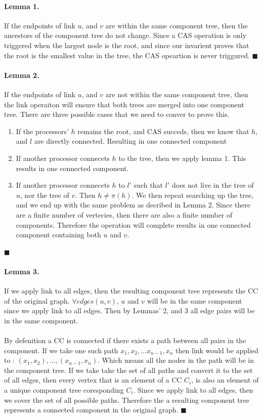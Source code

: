 \documentclass[]{article}
\newcommand*{\QEDA}{\hfill\ensuremath{\blacksquare}}%
\begin{document}
 \paragraph{Lemma 1.}
 If the endpoints of link $u$, and $v$ are within the same component tree, then the ancestors of the component tree do not change. Since a CAS operation is only triggered when the largest node is the root, and since our invarient proves that the root is the smallest value in the tree, the CAS opeartion is never triggured.
\QEDA 
\paragraph{Lemma 2.}
If the endpoints of link $u$, and $v$ are not within the same component tree, then the link operaiton will ensure that both trees are merged into one component tree. There are three possible cases that we need to conver to prove this.

\begin{enumerate}
  \item If the processors' $h$ remains the root, and CAS succeds, then we know that $h$, and $l$ are directly connected. Resulting in one connected component
  \item If another processor connecets $h$ to the tree, then we apply lemma 1. This results in one connected component.
  \item If another processor connecets $h$ to $l'$ such that $l'$ does not live in the tree of $u$, nor the tree of $v$. Then $h \neq \pi(h)$. We then repeat searching up the tree, and we end up with the same problem as decribed in Lemma 2. Since there are a finite number of vertecies, then there are also a finite number of components. Therefore the operation will complete results in one connected component containing both $u$ and $v$.
\end{enumerate}
\QEDA
\paragraph{Lemma 3.}
If we apply link to all edges, then the resulting component tree represents the CC of the original graph. $\forall edges(u,v)$, $u$ and $v$ will be in the same component since we apply link to all edges. Then by Lemmas' 2, and 3 all edge pairs will be in the same component.

\paragraph{}
By defenition a CC is connected if there exists a path between all pairs in the component. If we take one such path $x_1,x_2,...x_{n-1},x_n$ then link would be applied to : $(x_1,x_2),...,(x_{n-1},x_n)$. Which means all the nodes in the path will be in the component tree. If we take take the set of all paths and convert it to the set of all edges, then every vertex that is an element of a CC $C_i$, is also an element of a unique component tree coresponding $C_i$. Since we apply link to all edges, then we cover the set of all possible paths. Therefore the a resulting component tree represents a connected component in the original graph.
\QEDA
 
\end{document}
